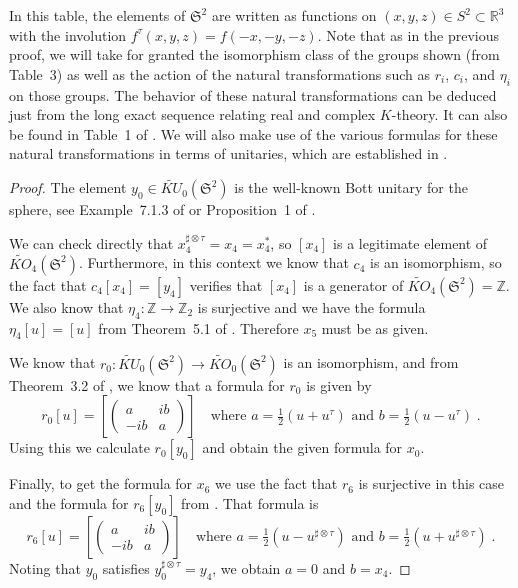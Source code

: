 \documentclass[12pt, reqno]{amsart}
\theoremstyle{definition}
\def\R{{\mathbb R}}
\def\Z{{\mathbb Z}}
\newcommand{\fS}{\mathfrak S}
\begin{document}
In this table, the elements of $\fS^2$ are written as functions on $(x,y,z) \in S^2 \subset \R^3$ with the involution $f^\tau(x,y,z)  = {f(-x,-y,-z)}$.
Note that as in the previous proof, we will take for granted the isomorphism class of the groups shown (from Table~3) as well as the action of the natural transformations such as $r_i$, $c_i$, and $\eta_i$ on those groups. The behavior of these natural transformations can be deduced just from the long exact sequence relating real and complex $K$-theory. It can also be found in Table~1 of \cite{Boer2002}. We will also make use of the various formulas for these natural transformations in terms of unitaries, which are established in \cite{Boer2020}.

\begin{proof}
The element $y_0 \in \widetilde{KU}_0(\fS^2)$ is the well-known Bott unitary for the sphere, see Example~7.1.3 of \cite{BL} or Proposition~1 of \cite{SBS}.

We can check directly that $x_4^{\sharp \otimes \tau} = x_4 = x_4^*$, so $[x_4]$ is a legitimate element of 
$\widetilde{KO}_4(\fS^2)$. Furthermore, in this context we know that $c_4$ is an isomorphism, so the fact that $c_4[x_4] = [y_4]$ verifies that $[x_4]$ is a generator of $\widetilde{KO}_4(\fS^2) = \Z$. We also know that $\eta_4 \colon \Z \rightarrow \Z_2$ is surjective and we have the formula $\eta_4[u] = [u]$ from Theorem~5.1 of \cite{Boer2020}. Therefore $x_5$ must be as given.

We know that $r_0 \colon \widetilde{KU}_0( \fS^2) \rightarrow \widetilde{KO}_0( \fS^2)$ is an isomorphism, and from Theorem~3.2 of \cite{Boer2002}, we know that a formula for $r_0$ is given by
$$r_0[u] = \left[ \left( \begin{smallmatrix} a & ib \\ -ib & a  \end{smallmatrix} \right) \right] \quad 
	\text{where $a = \tfrac{1}{2} (u + u^\tau)$ and $b = \tfrac{1}{2} (u - u^\tau)$} \; .$$
Using this we calculate $r_0[y_0]$ and obtain the given formula for $x_0$.

Finally, to get the formula for $x_6$ we use the fact that $r_6$ is surjective in this case and the formula for $r_6[y_0]$ from \cite{Boer2020}. That formula is
$$r_6[u] = \left[ \left( \begin{smallmatrix} a & ib \\ -ib & a  \end{smallmatrix} \right) \right] \quad 
	\text{where $a = \tfrac{1}{2} (u - u^{\sharp \otimes \tau})$ and $b = \tfrac{1}{2} (u + u^{\sharp \otimes \tau})$}  \;.$$
Noting that $y_0$ satisfies $y_0^{\sharp \otimes \tau} = y_4$, we obtain $a = 0$ and $b = x_4$.
\end{proof}
\end{document}
